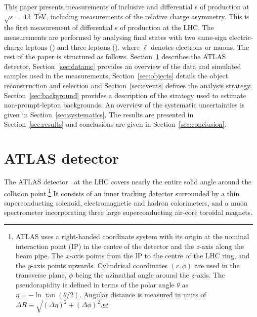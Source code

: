 \documentclass[cernpreprint, atlasdraft=false, texlive=2023, UKenglish, texmf, orcidlogo]{atlasdoc}
\begin{document}
 
 
This paper presents measurements of inclusive and differential \xs{}s of \ttW production
at $\sqrt{s}=13$~TeV, including measurements of the \ttW relative charge asymmetry.
This is the first measurement of differential \xs{}s of \ttW production at the LHC.
The measurements are performed by analysing final states with two same-sign electric-charge leptons (\llSS)
and three leptons (\lll), where $\ell$ denotes electrons or muons. The rest of the paper is
structured as follows. Section~\ref{sec:detector} describes the ATLAS
detector, Section~\ref{sec:datamc} provides an overview of the data
and simulated samples used in the measurements, Section~\ref{sec:objects}
details the object reconstruction and selection and
Section~\ref{sec:events} defines the analysis strategy.
Section~\ref{sec:background} provides a description of the strategy used to
estimate non-prompt-lepton backgrounds. An overview of the systematic
uncertainties is given in Section~\ref{sec:systematics}. The results
are presented in Section~\ref{sec:results} and conclusions are given
in Section~\ref{sec:conclusion}.


 
\section{ATLAS detector}
\label{sec:detector}

\newcommand{\AtlasCoordFootnote}{
ATLAS uses a right-handed coordinate system with its origin at the nominal interaction point (IP)
in the centre of the detector and the \(z\)-axis along the beam pipe.
The \(x\)-axis points from the IP to the centre of the LHC ring,
and the \(y\)-axis points upwards.
Cylindrical coordinates \((r,\phi)\) are used in the transverse plane,
\(\phi\) being the azimuthal angle around the \(z\)-axis.
The pseudorapidity is defined in terms of the polar angle \(\theta\) as \(\eta = -\ln \tan(\theta/2)\).
Angular distance is measured in units of \(\Delta R \equiv \sqrt{(\Delta\eta)^{2} + (\Delta\phi)^{2}}\).}
 
The ATLAS detector~\cite{PERF-2007-01} at the LHC covers nearly the entire solid angle around the collision point.\footnote{\AtlasCoordFootnote}
It consists of an inner tracking detector surrounded by a thin superconducting solenoid, electromagnetic and hadron calorimeters,
and a muon spectrometer incorporating three large superconducting air-core toroidal magnets.
 
\end{document}
